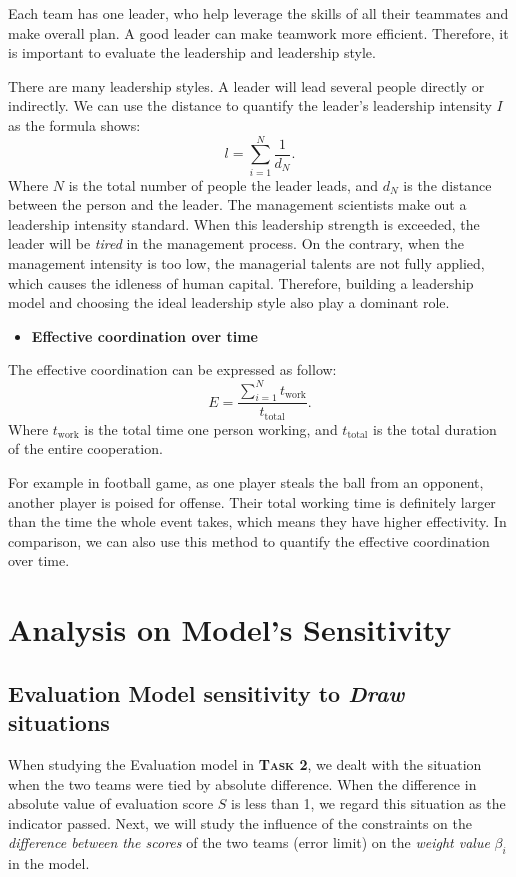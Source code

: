 \documentclass[12pt]{article}  %
\newcommand{\upcite}[1]{\textsuperscript{\textsuperscript{\cite{#1}}}}
\begin{document}
Each team has one leader, who help leverage the skills of all their teammates and make overall plan. A good leader can make teamwork more efficient. Therefore, it is important to evaluate the leadership and leadership style. 


There are many leadership styles. A leader will lead several people directly or indirectly. We can use the distance to quantify the leader's leadership intensity $I$ as the formula shows:
\begin{equation}
    l=\sum_{i=1}^{N}\frac{1}{d_N}.
\end{equation}
Where $N$ is  the total number of people the leader leads, and $d_N$ is the distance between the person and the leader.
The management scientists make out a leadership intensity standard\upcite{9}. When this leadership strength is exceeded, the leader will be \textit{tired} in the management process. On the contrary, when the management intensity is too low, the managerial talents are not fully applied, which causes the idleness of human capital. Therefore, building a leadership model and choosing the ideal leadership style also play a dominant role. 


\vspace{4pt}
\begin{itemize}
    \item \textbf{Effective coordination over time}
\end{itemize}

The effective coordination can be expressed as follow: 
\begin{equation}
    E=\frac{\displaystyle\sum_{i=1}^N t_{\mathrm{work}}}{t_{\mathrm{total}}}.
\end{equation}
Where $t_{\mathrm{work}}$ is the total time one person working, and $t_{\mathrm{total}}$ is  the total duration of the entire cooperation.

For example in football game, as one player steals the ball from an opponent, another player is poised for offense. Their total working time is definitely larger than the time the whole event takes, which means they have higher effectivity. In comparison, we can also use this method to quantify the effective coordination over time. 





\section{Analysis on Model's Sensitivity}
\subsection{Evaluation Model sensitivity to \textit{Draw} situations}
When studying the Evaluation model in \textbf{\textsc{Task 2}}, we dealt with the situation when the two teams were tied by  absolute difference. When the difference in absolute value of evaluation score $S$ is less than 1, we regard this situation as the indicator passed. 
Next, we will study the influence of the constraints on the \textit{difference between the scores} of the two teams (error limit) on the \textit{weight value} $\beta_i$ in the model.
\end{document}
